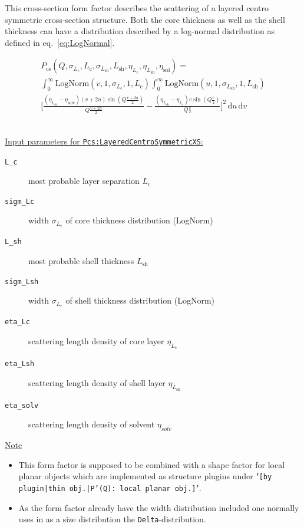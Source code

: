 This cross-section form factor describes the scattering of a layered centro symmetric cross-section structure.
Both the core thickness as well as the shell thickness can have a distribution described by a log-normal distribution as defined in eq.\ \ref{eq:LogNormal}.

\begin{multline}
P_\text{cs}(Q,\sigma_{L_\textrm{c}},L_\textrm{c},\sigma_{L_\textrm{sh}},L_\textrm{sh},\eta_{L_\textrm{c}},\eta_{L_\textrm{sh}},\eta_\textrm{sol}) = \\
\int_0^\infty \textrm{LogNorm}(v,1,\sigma_{L_\textrm{c}},1,L_\textrm{c})
\int_0^\infty \textrm{LogNorm}(u,1,\sigma_{L_\textrm{sh}},1,L_\textrm{sh}) \\
     \Bigg[ \frac{(\eta_{L_\textrm{sh}}-\eta_\textrm{solv})(v+2u) \sin\left(Q\frac{v+2u}{2}\right)}{Q\frac{v+2u}{2}}
          -\frac{(\eta_{L_\textrm{sh}}-\eta_{L_\textrm{c}})  v   \sin\left(Q \frac{v}{2}\right)}{Q \frac{v}{2}}
    \Bigg]^2 \,
\textrm{d}u \, \textrm{d}v
\end{multline}

\vspace{5mm}

\hspace{1pt}\\
\uline{Input parameters for \texttt{Pcs:LayeredCentroSymmetricXS}:}
\begin{description}
    \item[\texttt{L\_c}] most probable layer separation $L_\textrm{c}$
    \item[\texttt{sigm\_Lc}] width $\sigma_{L_\textrm{c}}$ of core thickness distribution (LogNorm)
    \item[\texttt{L\_sh}] most probable shell thickness $L_\textrm{sh}$
    \item[\texttt{sigm\_Lsh}] width $\sigma_{L_\textrm{c}}$ of shell thickness distribution (LogNorm)
    \item[\texttt{eta\_Lc}] scattering length density of core layer $\eta_{L_\textrm{c}}$
    \item[\texttt{eta\_Lsh}] scattering length density of shell layer $\eta_{L_\textrm{sh}}$
    \item[\texttt{eta\_solv}] scattering length density of solvent $\eta_{solv}$
\end{description}

\noindent
\uline{Note}
\begin{itemize}
  \item This form factor is supposed to be combined with a shape factor for
local planar objects which are implemented as structure  plugins
under "\texttt{[by plugin|thin obj.|P'(Q): local planar
obj.]}".
\item As the form factor already have the width distribution included one normally uses in \SASfit as a size distribution
the \texttt{Delta}-distribution.
\end{itemize}

